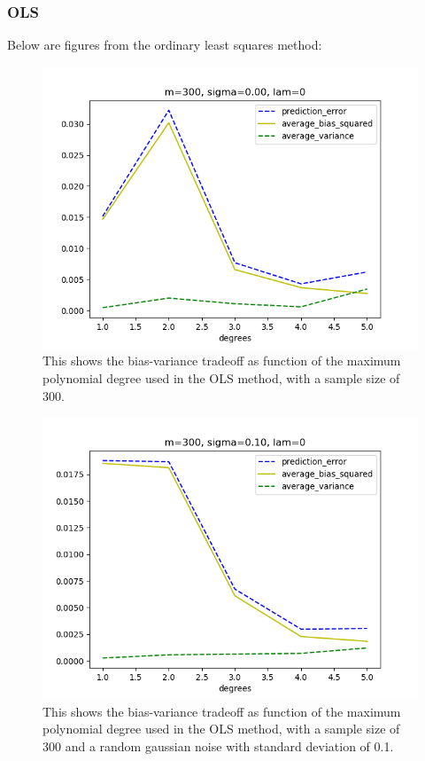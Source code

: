 \subsubsection{OLS}
Below are figures from the ordinary least squares method:
\FloatBarrier
\begin{figure}[!ht]
	\centering
	\FloatBarrier
    \includegraphics[width=1\textwidth]{plot_ols_without_r2/olsprediction_error_vs_degrees_m300_l300_s0.png}
	
	\caption{This shows the bias-variance tradeoff as function of the maximum polynomial degree used in the OLS method, with a sample size of 300.}
	\label{fig:1}
\end{figure}
\FloatBarrier

\medskip

\FloatBarrier
\begin{figure}[!ht]
	\centering
	\FloatBarrier
	\includegraphics[width=1\textwidth]{plot_ols_without_r2/olsprediction_error_vs_degrees_m300_l300_s10.png}
	
	\caption{This shows the bias-variance tradeoff as function of the maximum polynomial degree used in the OLS method, with a sample size of 300 and a random gaussian noise with standard deviation of 0.1.}
	\label{fig:1}
\end{figure}
\FloatBarrier


